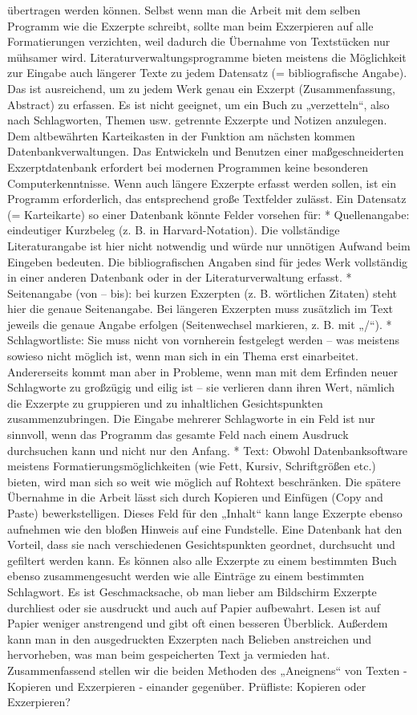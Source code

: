 \documentclass[]{book}
\theoremstyle{definition}
\theoremstyle{definition}
\theoremstyle{definition}
\theoremstyle{remark}
\begin{document}
übertragen werden können. Selbst wenn man die Arbeit mit dem selben
Programm wie die Exzerpte schreibt, sollte man beim Exzerpieren auf alle
Formatierungen verzichten, weil dadurch die Übernahme von Textstücken
nur mühsamer wird. Literaturverwaltungsprogramme bieten meistens die
Möglichkeit zur Eingabe auch längerer Texte zu jedem Datensatz (=
bibliografische Angabe). Das ist ausreichend, um zu jedem Werk genau ein
Exzerpt (Zusammenfassung, Abstract) zu erfassen. Es ist nicht geeignet,
um ein Buch zu „verzetteln``, also nach Schlagworten, Themen usw.
getrennte Exzerpte und Notizen anzulegen. Dem altbewährten Karteikasten
in der Funktion am nächsten kommen Datenbankverwaltungen. Das Entwickeln
und Benutzen einer maßgeschneiderten Exzerptdatenbank erfordert bei
modernen Programmen keine besonderen Computerkenntnisse. Wenn auch
längere Exzerpte erfasst werden sollen, ist ein Programm erforderlich,
das entsprechend große Textfelder zulässt. Ein Datensatz (= Karteikarte)
so einer Datenbank könnte Felder vorsehen für: * Quellenangabe:
eindeutiger Kurzbeleg (z. B. in Harvard-Notation). Die vollständige
Literaturangabe ist hier nicht notwendig und würde nur unnötigen Aufwand
beim Eingeben bedeuten. Die bibliografischen Angaben sind für jedes Werk
vollständig in einer anderen Datenbank oder in der Literaturverwaltung
erfasst. * Seitenangabe (von -- bis): bei kurzen Exzerpten (z. B.
wörtlichen Zitaten) steht hier die genaue Seitenangabe. Bei längeren
Exzerpten muss zusätzlich im Text jeweils die genaue Angabe erfolgen
(Seitenwechsel markieren, z. B. mit „/``). * Schlagwortliste: Sie muss
nicht von vornherein festgelegt werden -- was meistens sowieso nicht
möglich ist, wenn man sich in ein Thema erst einarbeitet. Andererseits
kommt man aber in Probleme, wenn man mit dem Erfinden neuer Schlagworte
zu großzügig und eilig ist -- sie verlieren dann ihren Wert, nämlich die
Exzerpte zu gruppieren und zu inhaltlichen Gesichtspunkten
zusammenzubringen. Die Eingabe mehrerer Schlagworte in ein Feld ist nur
sinnvoll, wenn das Programm das gesamte Feld nach einem Ausdruck
durchsuchen kann und nicht nur den Anfang. * Text: Obwohl
Datenbanksoftware meistens Formatierungsmöglichkeiten (wie Fett, Kursiv,
Schriftgrößen etc.) bieten, wird man sich so weit wie möglich auf
Rohtext beschränken. Die spätere Übernahme in die Arbeit lässt sich
durch Kopieren und Einfügen (Copy and Paste) bewerkstelligen. Dieses
Feld für den „Inhalt`` kann lange Exzerpte ebenso aufnehmen wie den
bloßen Hinweis auf eine Fundstelle. Eine Datenbank hat den Vorteil, dass
sie nach verschiedenen Gesichtspunkten geordnet, durchsucht und
gefiltert werden kann. Es können also alle Exzerpte zu einem bestimmten
Buch ebenso zusammengesucht werden wie alle Einträge zu einem bestimmten
Schlagwort. Es ist Geschmacksache, ob man lieber am Bildschirm Exzerpte
durchliest oder sie ausdruckt und auch auf Papier aufbewahrt. Lesen ist
auf Papier weniger anstrengend und gibt oft einen besseren Überblick.
Außerdem kann man in den ausgedruckten Exzerpten nach Belieben
anstreichen und hervorheben, was man beim gespeicherten Text ja
vermieden hat. Zusammenfassend stellen wir die beiden Methoden des
„Aneignens`` von Texten - Kopieren und Exzerpieren - einander gegenüber.
Prüfliste: Kopieren oder Exzerpieren?
\end{document}
